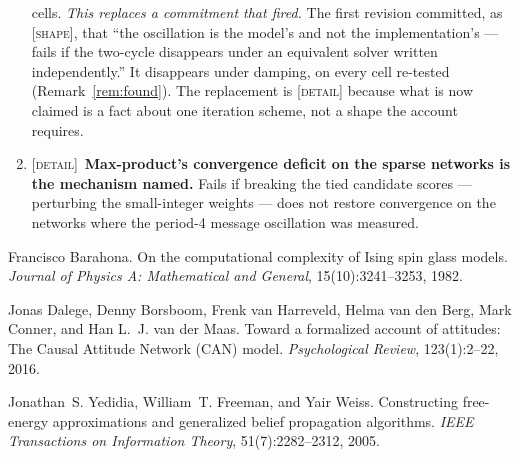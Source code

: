 \documentclass[11pt,a4paper]{article}
\theoremstyle{remark}
\begin{document}
\begin{enumerate}[leftmargin=*]
cells. \emph{This replaces a commitment that fired.} The first revision committed, as
\textsc{[shape]}, that ``the oscillation is the model's and not the implementation's --- fails if the
two-cycle disappears under an equivalent solver written independently.'' It disappears under damping,
on every cell re-tested (Remark~\ref{rem:found}). The replacement is \textsc{[detail]} because what is
now claimed is a fact about one iteration scheme, not a shape the account requires.
\item \textsc{[detail]}~\textbf{Max-product's convergence deficit on the sparse networks is the
mechanism named.} Fails if breaking the tied candidate scores --- perturbing the small-integer weights
--- does not restore convergence on the networks where the period-4 message oscillation was measured.
\end{enumerate}

\begin{thebibliography}{9}

Francisco Barahona.
\newblock On the computational complexity of Ising spin glass models.
\newblock \emph{Journal of Physics A: Mathematical and General}, 15(10):3241--3253, 1982.

Jonas Dalege, Denny Borsboom, Frenk van Harreveld, Helma van den Berg, Mark Conner, and Han L.~J.
van der Maas.
\newblock Toward a formalized account of attitudes: The Causal Attitude Network (CAN) model.
\newblock \emph{Psychological Review}, 123(1):2--22, 2016.

Jonathan~S. Yedidia, William~T. Freeman, and Yair Weiss.
\newblock Constructing free-energy approximations and generalized belief propagation algorithms.
\newblock \emph{IEEE Transactions on Information Theory}, 51(7):2282--2312, 2005.

\end{thebibliography}
\end{document}
